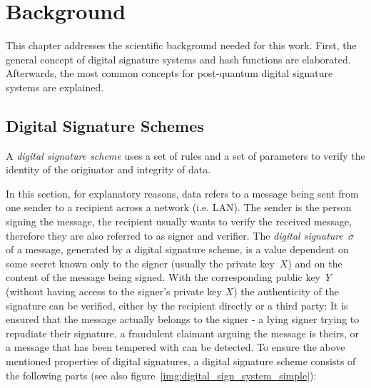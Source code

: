\chapter{Background}
\label{cha:background}
This chapter addresses the scientific background needed for this work. First, the general concept of digital signature systems and hash functions are elaborated. Afterwards, the most common concepts for post-quantum digital signature systems are explained. 

\section{Digital Signature Schemes}
A \textit{digital signature scheme} uses a set of rules and a set of parameters to verify the identity of the originator and integrity of data.~\cite{cha:bg_digital_sign_schemes_NIST_standard1992} 

In this section, for explanatory reasons, data refers to a message being sent from one sender to a recipient across a network (i.e. LAN). The sender is the person signing the message, the recipient usually wants to verify the received message, therefore they are also referred to as signer and verifier. %
The \textit{digital signature~$\sigma$} of a message, generated by a digital signature scheme, is a value dependent on some secret known only to the signer (usually the private key~$X$) and on the content of the message being signed. With the corresponding public key~$Y$ (without having access to the signer's private key $X$) the authenticity of the signature can be verified, either by the recipient directly or a third party: It is ensured that the message actually belongs to the signer - a lying signer trying to repudiate their signature, a fraudulent claimant arguing the message is theirs, or a message that has been tempered with can be detected.
To ensure the above mentioned properties of digital signatures, a digital signature scheme consists of the following parts (see also figure~\ref{img:digital_sign_system_simple}):~\cite{cha:bg_signature_schemes_book_menezes2018_1997} %

